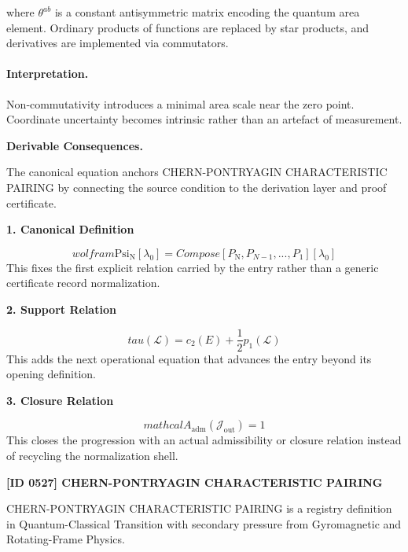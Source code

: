 where $\theta^{ab}$ is a constant antisymmetric matrix encoding the quantum area element.  Ordinary products of functions are replaced by star products, and derivatives are implemented via commutators.

\paragraph{Interpretation.}

Non‑commutativity introduces a minimal area scale near the zero point.  Coordinate uncertainty becomes intrinsic rather than an artefact of measurement.

\par\vspace{0.35em}
\noindent\textbf{Derivable Consequences.}\quad
\begingroup
\footnotesize
\raggedright
The canonical equation anchors CHERN-PONTRYAGIN CHARACTERISTIC PAIRING by connecting the source condition to the derivation layer and proof certificate.
\par\endgroup

\noindent\textbf{1. Canonical Definition}\par
\[
wolfram\mathrm{Psi}_{\mathrm{N}}[\lambda_0] = Compose[P_{\mathrm{N}}, P_{N-1}, ..., P_1][\lambda_0]
\]
\noindent This fixes the first explicit relation carried by the entry rather than a generic certificate record normalization.\par
\noindent\textbf{2. Support Relation}\par
\[
tau(\mathcal{L}) = c_2(E) + \frac{1}{2}p_1(\mathcal{L})
\]
\noindent This adds the next operational equation that advances the entry beyond its opening definition.\par
\noindent\textbf{3. Closure Relation}\par
\[
mathcal{A}_{\mathrm{adm}}\!\left(\mathcal{J}_{\mathrm{out}}\right)=1
\]
\noindent This closes the progression with an actual admissibility or closure relation instead of recycling the normalization shell.\par

\clearpage
\noindent\textbf{[ID 0527] CHERN-PONTRYAGIN CHARACTERISTIC PAIRING}\par
\vspace{0.35em}
\begingroup\small
{}
CHERN-PONTRYAGIN CHARACTERISTIC PAIRING is a registry definition in Quantum-Classical Transition with secondary pressure from Gyromagnetic and Rotating-Frame Physics.

